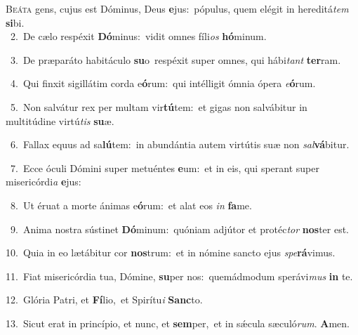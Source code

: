 \lettrine{\initial\textcolor{\initialcolor}{B}}{eáta} gens, cujus est Dóminus, Deus \textbf{e}\-jus:~\star pópulus, quem elégit in hereditá\textit{tem} \textbf{si}\-bi.\\
{\numbfont\textcolor{\numbcolor}{~2.}}~De cælo respéxit \textbf{Dó}\-minus:~\star vidit omnes fíli\textit{os} \textbf{hó}\-minum.\par
{\numbfont\textcolor{\numbcolor}{~3.}}~De præparáto habitáculo \textbf{su}\-o~\star respéxit super omnes, qui hábi\textit{tant} \textbf{ter}\-ram.\par
{\numbfont\textcolor{\numbcolor}{~4.}}~Qui finxit sigillátim corda e\-\textbf{ó}\-rum:~\star qui intélligit ómnia ópera \textit{e}\-\textbf{ó}rum.\par
{\numbfont\textcolor{\numbcolor}{~5.}}~Non salvátur rex per multam vir\-\textbf{tú}\-tem:~\star et gigas non salvábitur in multitúdine virtú\textit{tis} \textbf{su}\-æ.\par
{\numbfont\textcolor{\numbcolor}{~6.}}~Fallax equus ad sa\-\textbf{lú}\-tem:~\star in abundántia autem virtútis suæ non \textit{sal}\-\textbf{vá}bitur.\par
{\numbfont\textcolor{\numbcolor}{~7.}}~Ecce óculi Dómini super metuéntes \textbf{e}\-um:~\star et in eis, qui sperant super misericórdi\textit{a} \textbf{e}\-jus:\par
{\numbfont\textcolor{\numbcolor}{~8.}}~Ut éruat a morte ánimas e\-\textbf{ó}\-rum:~\star et alat eos \textit{in} \textbf{fa}\-me.\par
{\numbfont\textcolor{\numbcolor}{~9.}}~Anima nostra sústinet \textbf{Dó}\-minum:~\star quóniam adjútor et protéc\textit{tor} \textbf{nos}\-ter est.\par
{\numbfont\textcolor{\numbcolor}{10.}}~Quia in eo lætábitur cor \textbf{nos}\-trum:~\star et in nómine sancto ejus \textit{spe}\-\textbf{rá}vimus.\par
{\numbfont\textcolor{\numbcolor}{11.}}~Fiat misericórdia tua, Dómine, \textbf{su}\-per nos:~\star quemádmodum sperávi\textit{mus} \textbf{in} te.\par
{\numbfont\textcolor{\numbcolor}{12.}}~Glória Patri, et \textbf{Fí}\-lio,~\star et Spirítu\textit{i} \textbf{Sanc}\-to.\par
{\numbfont\textcolor{\numbcolor}{13.}}~Sicut erat in princípio, et nunc, et \textbf{sem}\-per,~\star et in sǽcula sæculó\-\textit{rum}\-. \textbf{A}\-men.\par
